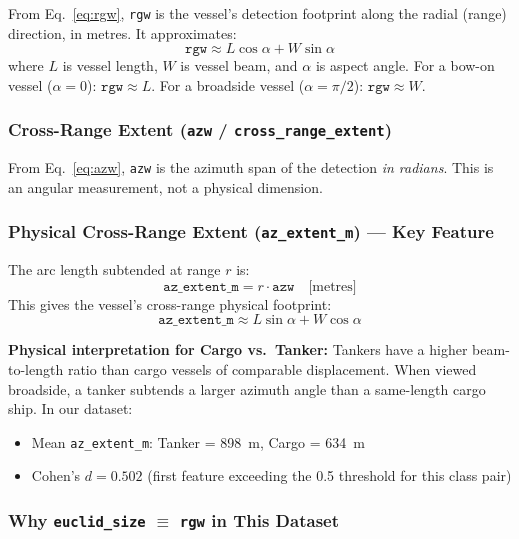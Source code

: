 \documentclass[journal]{IEEEtran}
\begin{document}
From Eq.~\ref{eq:rgw}, \texttt{rgw} is the vessel's detection footprint along
the radial (range) direction, in metres. It approximates:
\begin{equation}
  \texttt{rgw} \approx L\cos\alpha + W\sin\alpha
\end{equation}
where $L$ is vessel length, $W$ is vessel beam, and $\alpha$ is aspect angle.
For a bow-on vessel ($\alpha=0$): $\texttt{rgw} \approx L$.
For a broadside vessel ($\alpha=\pi/2$): $\texttt{rgw} \approx W$.

\subsubsection{Cross-Range Extent (\texttt{azw} / \texttt{cross\_range\_extent})}

From Eq.~\ref{eq:azw}, \texttt{azw} is the azimuth span of the detection
\emph{in radians}. This is an angular measurement, not a physical dimension.

\subsubsection{Physical Cross-Range Extent (\texttt{az\_extent\_m}) — Key Feature}

The arc length subtended at range $r$ is:
\begin{equation}
  \boxed{\texttt{az\_extent\_m} = r \cdot \texttt{azw} \quad \text{[metres]}}
  \label{eq:az_extent}
\end{equation}
This gives the vessel's cross-range physical footprint:
\begin{equation}
  \texttt{az\_extent\_m} \approx L\sin\alpha + W\cos\alpha
\end{equation}

\textbf{Physical interpretation for Cargo vs.\ Tanker:}
Tankers have a higher beam-to-length ratio than cargo vessels of comparable
displacement. When viewed broadside, a tanker subtends a larger azimuth angle
than a same-length cargo ship. In our dataset:
\begin{itemize}
  \item Mean \texttt{az\_extent\_m}: Tanker = 898~m, Cargo = 634~m
  \item Cohen's $d = 0.502$ (first feature exceeding the 0.5 threshold for
        this class pair)
\end{itemize}

\subsubsection{Why \texttt{euclid\_size} $\equiv$ \texttt{rgw} in This Dataset}
\end{document}
